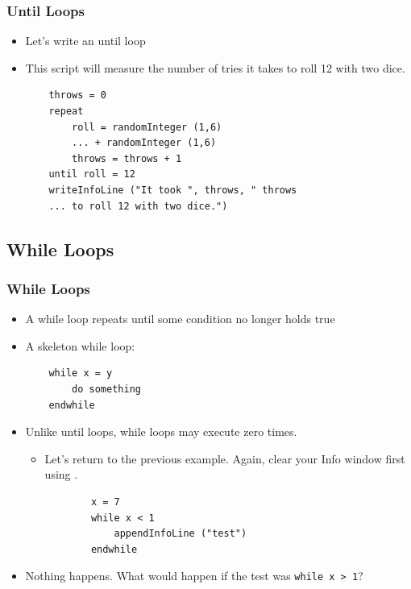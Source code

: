 \documentclass[handout]{beamer}
\begin{document}
\begin{frame}[fragile]
\frametitle{Until Loops}

\begin{itemize}
    \item <1-> Let's write an until loop

    \item <1-> This script will measure the number of tries it takes to roll 12 with two dice.

    \begin{verbatim}
    throws = 0
    repeat
        roll = randomInteger (1,6) 
        ... + randomInteger (1,6)
        throws = throws + 1
    until roll = 12
    writeInfoLine ("It took ", throws, " throws
    ... to roll 12 with two dice.")
    \end{verbatim}

\end{itemize}  
\end{frame}

\subsection{While Loops}

\begin{frame}[fragile]
\frametitle{While Loops}

\begin{itemize}
    \item <1-> A while loop repeats until some condition no longer holds true

    \item <1-> A skeleton while loop:
    \begin{verbatim}
    while x = y
        do something
    endwhile
    \end{verbatim}

    \item <2-> Unlike until loops, while loops may execute zero times.
    \begin{itemize}
        \item Let's return to the previous example. Again, clear your Info window first using .
        \begin{verbatim}
        x = 7
        while x < 1
            appendInfoLine ("test")
        endwhile
    \end{verbatim}
    \end{itemize}

    \item <3-> Nothing happens. What would happen if the test was \texttt{while x > 1}?

\end{itemize}  
\end{frame}
\end{document}
